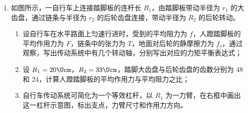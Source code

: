 \documentclass[\gkver]{gaokaozhenti}
\begin{document}
\begin{enumerate}

\item
如图所示，一自行车上连接踏脚板的连杆长 $R_{1}$，由踏脚板带动半径为 $r_{1}$ 的大齿盘，通过链条与半径为 $r_{2}$ 的后轮齿盘连接，带动半径为 $R_{2}$ 的后轮转动。

\begin{enumerate}
\item
设自行车在水平路面上匀速行进时，受到的平均阻力为 $f$，人蹬踏脚板的平均作用力为 $F$，链条中的张力为 $T$，地面对后轮的静摩擦力为 $f_{s}$，通过观察，写出传动系统中有几个转动轴，分别写出对应的力矩平衡表达式；
\item
设 $R_{1}=20\Ucm$，$R_{2}=33\Ucm$，踏脚大齿盘与后轮齿盘的齿数分别为 48 和 24，计算人蹬踏脚板的平均作用力与平均阻力之比；
\item
自行车传动系统可简化为一个等效杠杆，以 $R_{1}$ 为一力臂，在右框中画出这一杠杆示意图，标出支点，力臂尺寸和作用力方向。
\end{enumerate}



\end{enumerate}
\end{document}
